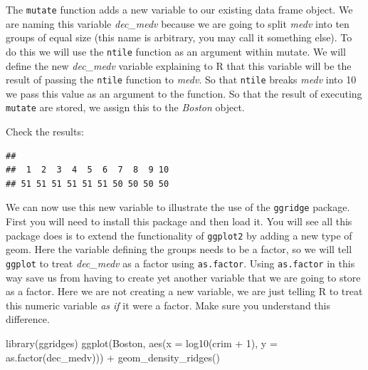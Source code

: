 \documentclass[
]{book}
\newenvironment{Shaded}{\begin{snugshade}}{\end{snugshade}}
\newcommand{\AttributeTok}[1]{\textcolor[rgb]{0.77,0.63,0.00}{#1}}
\newcommand{\DecValTok}[1]{\textcolor[rgb]{0.00,0.00,0.81}{#1}}
\newcommand{\FunctionTok}[1]{\textcolor[rgb]{0.00,0.00,0.00}{#1}}
\newcommand{\NormalTok}[1]{#1}
\newcommand{\SpecialCharTok}[1]{\textcolor[rgb]{0.00,0.00,0.00}{#1}}
\begin{document}
The \texttt{mutate} function adds a new variable to our existing data frame object. We are naming this variable \emph{dec\_medv} because we are going to split \emph{medv} into ten groups of equal size (this name is arbitrary, you may call it something else). To do this we will use the \texttt{ntile} function as an argument within mutate. We will define the new \emph{dec\_medv} variable explaining to R that this variable will be the result of passing the \texttt{ntile} function to \emph{medv}. So that \texttt{ntile} breaks \emph{medv} into 10 we pass this value as an argument to the function. So that the result of executing \texttt{mutate} are stored, we assign this to the \emph{Boston} object.

Check the results:

\begin{Shaded}
\end{Shaded}

\begin{verbatim}
## 
##  1  2  3  4  5  6  7  8  9 10 
## 51 51 51 51 51 51 50 50 50 50
\end{verbatim}

We can now use this new variable to illustrate the use of the \texttt{ggridge} package. First you will need to install this package and then load it. You will see all this package does is to extend the functionality of \texttt{ggplot2} by adding a new type of geom. Here the variable defining the groups needs to be a factor, so we will tell \texttt{ggplot} to treat \emph{dec\_medv} as a factor using \texttt{as.factor}. Using \texttt{as.factor} in this way save us from having to create yet another variable that we are going to store as a factor. Here we are not creating a new variable, we are just telling R to treat this numeric variable \emph{as if} it were a factor. Make sure you understand this difference.

\begin{Shaded}
\begin{Highlighting}[]
\FunctionTok{library}\NormalTok{(ggridges)}
\FunctionTok{ggplot}\NormalTok{(Boston, }\FunctionTok{aes}\NormalTok{(}\AttributeTok{x =} \FunctionTok{log10}\NormalTok{(crim }\SpecialCharTok{+} \DecValTok{1}\NormalTok{), }\AttributeTok{y =} \FunctionTok{as.factor}\NormalTok{(dec\_medv))) }\SpecialCharTok{+} \FunctionTok{geom\_density\_ridges}\NormalTok{()}
\end{Highlighting}
\end{Shaded}
\end{document}
